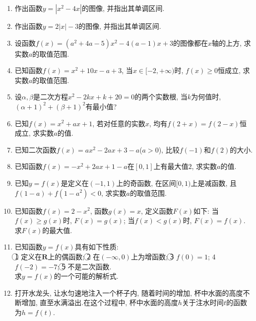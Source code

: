 \documentclass[10pt,a4paper]{article}
\begin{document}
\begin{enumerate}[1.]
\item 作出函数$y=|x^2-4x|$的图像, 并指出其单调区间.
\item 作出函数$y=2|x|-3$的图像, 并指出其单调区间.
\item 设函数$f(x)=(a^2+4a-5)x^2-4(a-1)x+3$的图像都在$x$轴的上方, 求实数$a$的取值范围.
\item 已知函数$f(x)=x^2+10x-a+3$, 当$x\in [-2,+\infty)$时, $f(x)\ge 0$恒成立, 求实数$a$的取值范围.
\item 设$\alpha,\beta$是二次方程$x^2-2kx+k+20=0$的两个实数根, 当$k$为何值时, $(\alpha +1)^2+(\beta +1)^2$有最小值?
\item 已知$f(x)=x^2+ax+1$, 若对任意的实数$x$, 均有$f(2+x)=f(2-x)$恒成立, 求实数$a$的值.
\item 已知二次函数$f(x)=ax^2-2ax+3-a$($a>0$), 比较$f(-1)$和$f(2)$的大小.
\item 已知函数$f(x)=-x^2+2ax+1-a$在$[0,1]$上有最大值$2$, 求实数$a$的值.
\item 已知$y=f(x)$是定义在$(-1,1)$上的奇函数, 在区间$[0,1)$上是减函数, 且$f(1-a)+f(1-a^2)<0$, 求实数$a$的取值范围.
\item 已知函数$f(x)=2-x^2$, 函数$g(x)=x$, 定义函数$F(x)$如下: 当$f(x)\ge g(x)$时, $F(x)=g(x)$; 当$f(x)<g(x)$时, $F(x)=f(x)$. 求$F(x)$的最大值.
\item 已知函数$y=f(x)$具有如下性质:\\
\textcircled{1} 定义在$\mathbf{R}$上的偶函数; \textcircled{2} 在$(-\infty ,0)$上为增函数; \textcircled{3} $f(0)=1$; \textcircled{4} $f(-2)=-7$; \textcircled{5} 不是二次函数.\\
求$y=f(x)$的一个可能的解析式.
\item 打开水龙头, 让水匀速地注入一个杯子内, 随着时间的增加, 杯中水面的高度不断增加, 直至水满溢出.在这个过程中, 杯中水面的高度$h$关于注水时间$t$的函数为$h=f(t)$.
\begin{center}
\end{center}
\end{enumerate}
\end{document}
